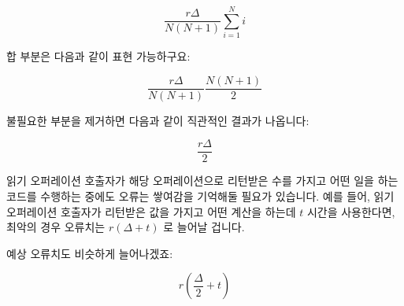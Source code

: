 {	\begin{equation}
		\frac{r \Delta}{N \left( N + 1 \right)}
			\sum_{i = 1}^N i
	\end{equation}
	\fi

	합 부분은 다음과 같이 표현 가능하구요:

	\begin{equation}
		\frac{r \Delta}{N \left( N + 1 \right)}
			\frac{N \left( N + 1 \right)}{2}
	\end{equation}

	불필요한 부분을 제거하면 다음과 같이 직관적인 결과가 나옵니다:

	\begin{equation}
		\frac{r \Delta}{2}
	\label{eq:count:CounterErrorAverage}
	\end{equation}

	읽기 오퍼레이션 호출자가 해당 오퍼레이션으로 리턴받은 수를 가지고 어떤
	일을 하는 코드를 수행하는 중에도 오류는 쌓여감을 기억해둘 필요가
	있습니다.
	예를 들어, 읽기 오퍼레이션 호출자가 리턴받은 값을 가지고 어떤 계산을
	하는데 $t$ 시간을 사용한다면, 최악의 경우 오류치는 $r \left(\Delta +
	t\right)$ 로 늘어날 겁니다.

	예상 오류치도 비슷하게 늘어나겠죠:

	\begin{equation}
		r \left( \frac{\Delta}{2} + t \right)
	\end{equation}

}

